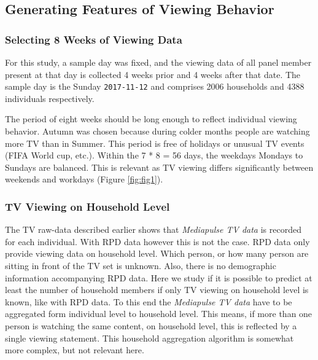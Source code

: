 \documentclass[]{article}
\begin{document}
\hypertarget{generating-features-of-viewing-behavior}{%
\subsection{Generating Features of Viewing
Behavior}\label{generating-features-of-viewing-behavior}}

\hypertarget{selecting-8-weeks-of-viewing-data}{%
\subsubsection{Selecting 8 Weeks of Viewing
Data}\label{selecting-8-weeks-of-viewing-data}}

For this study, a sample day was fixed, and the viewing data of all
panel member present at that day is collected 4 weeks prior and 4 weeks
after that date. The sample day is the Sunday \texttt{2017-11-12} and
comprises 2006 households and 4388 individuals respectively.

The period of eight weeks should be long enough to reflect individual
viewing behavior. Autumn was chosen because during colder months people
are watching more TV than in Summer. This period is free of holidays or
unusual TV events (FIFA World cup, etc.). Within the 7 * 8 = 56 days,
the weekdays Mondays to Sundays are balanced. This is relevant as TV
viewing differs significantly between weekends and workdays (Figure
\ref{fig:fig1}).

\hypertarget{tv-viewing-on-household-level}{%
\subsubsection{TV Viewing on Household
Level}\label{tv-viewing-on-household-level}}

The TV raw-data described earlier shows that \emph{Mediapulse TV data}
is recorded for each individual. With RPD data however this is not the
case. RPD data only provide viewing data on household level. Which
person, or how many person are sitting in front of the TV set is
unknown. Also, there is no demographic information accompanying RPD
data. Here we study if it is possible to predict at least the number of
household members if only TV viewing on household level is known, like
with RPD data. To this end the \emph{Mediapulse TV data} have to be
aggregated form individual level to household level. This means, if more
than one person is watching the same content, on household level, this
is reflected by a single viewing statement. This household aggregation
algorithm is somewhat more complex, but not relevant here.
\end{document}
